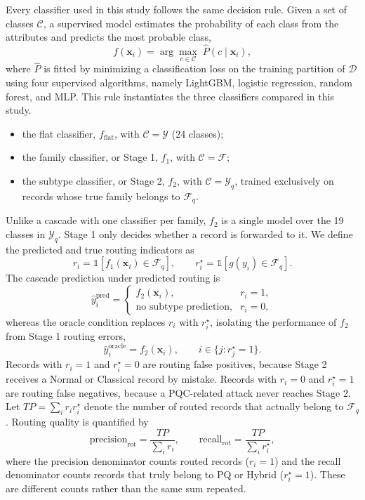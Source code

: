 \documentclass{IEEEoj}
\begin{document}
Every classifier used in this study follows the same decision rule. Given a
set of classes $\mathcal{C}$, a supervised model estimates the probability of
each class from the attributes and predicts the most probable class,
\begin{equation}
f(\mathbf{x}_i) = \arg\max_{c \in \mathcal{C}} \; \hat{P}(c \mid \mathbf{x}_i),
\end{equation}
where $\hat{P}$ is fitted by minimizing a classification loss on the training
partition of $\mathcal{D}$ using four supervised algorithms, namely LightGBM,
logistic regression, random forest, and MLP. This rule instantiates the three
classifiers compared in this study.
\begin{itemize}
\item the flat classifier, $f_{\mathrm{flat}}$, with $\mathcal{C}=\mathcal{Y}$
(24 classes);
\item the family classifier, or Stage 1, $f_1$, with $\mathcal{C}=\mathcal{F}$;
\item the subtype classifier, or Stage 2, $f_2$, with
$\mathcal{C}=\mathcal{Y}_q$, trained exclusively on records whose true family
belongs to $\mathcal{F}_q$.
\end{itemize}
Unlike a cascade with one classifier per family, $f_2$ is a single model over
the 19 classes in $\mathcal{Y}_q$. Stage 1 only decides whether a record is
forwarded to it. We define the predicted and true routing indicators as
\begin{equation}
r_i = \mathbb{1}[f_1(\mathbf{x}_i) \in \mathcal{F}_q], \qquad
r_i^{\star} = \mathbb{1}[g(y_i) \in \mathcal{F}_q].
\end{equation}
The cascade prediction under predicted routing is
\begin{equation}
\hat{y}_i^{\mathrm{pred}} =
\begin{cases}
f_2(\mathbf{x}_i), & r_i = 1,\\
\text{no subtype prediction}, & r_i = 0,
\end{cases}
\end{equation}
whereas the oracle condition replaces $r_i$ with $r_i^{\star}$, isolating the
performance of $f_2$ from Stage 1 routing errors,
\begin{equation}
\hat{y}_i^{\mathrm{oracle}} = f_2(\mathbf{x}_i), \qquad i \in \{j : r_j^{\star} = 1\}.
\end{equation}
Records with $r_i = 1$ and $r_i^{\star} = 0$ are routing false positives,
because Stage 2 receives a Normal or Classical record by mistake. Records
with $r_i = 0$ and $r_i^{\star} = 1$ are routing false negatives, because a
PQC-related attack never reaches Stage 2. Let $TP = \sum_i r_i r_i^{\star}$
denote the number of routed records that actually belong to $\mathcal{F}_q$.
Routing quality is quantified by
\begin{equation}
\text{precision}_{\mathrm{rot}} = \frac{TP}{\sum_i r_i},
\qquad
\text{recall}_{\mathrm{rot}} = \frac{TP}{\sum_i r_i^{\star}},
\end{equation}
where the precision denominator counts routed records ($r_i=1$) and the recall
denominator counts records that truly belong to PQ or Hybrid ($r_i^{\star}=1$).
These are different counts rather than the same sum repeated.
\end{document}
